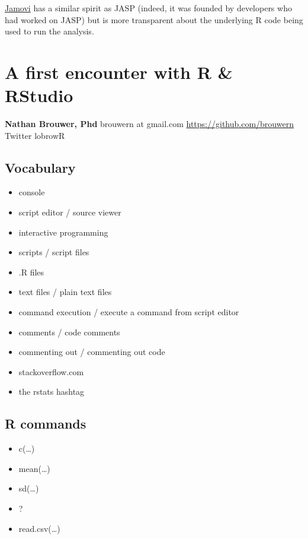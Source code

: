 \documentclass[]{book}
\providecommand{\tightlist}{%
  \setlength{\itemsep}{0pt}\setlength{\parskip}{0pt}}
\theoremstyle{definition}
\theoremstyle{definition}
\theoremstyle{definition}
\theoremstyle{remark}
\begin{document}
\href{https://www.jamovi.org/}{Jamovi} has a similar spirit as JASP
(indeed, it was founded by developers who had worked on JASP) but is
more transparent about the underlying R code being used to run the
analysis.

\chapter{A first encounter with R \&
RStudio}\label{a-first-encounter-with-r-rstudio}

\textbf{Nathan Brouwer, Phd} brouwern at gmail.com
\url{https://github.com/brouwern} Twitter lobrowR

\section*{Vocabulary}\label{vocabulary}

\begin{itemize}
\tightlist
\item
  console
\item
  script editor / source viewer
\item
  interactive programming
\item
  scripts / script files
\item
  .R files
\item
  text files / plain text files
\item
  command execution / execute a command from script editor
\item
  comments / code comments
\item
  commenting out / commenting out code
\item
  stackoverflow.com
\item
  the rstats hashtag
\end{itemize}

\section*{R commands}\label{r-commands}

\begin{itemize}
\tightlist
\item
  c(\ldots{})
\item
  mean(\ldots{})
\item
  sd(\ldots{})
\item
  ?
\item
  read.csv(\ldots{})
\end{itemize}
\end{document}
